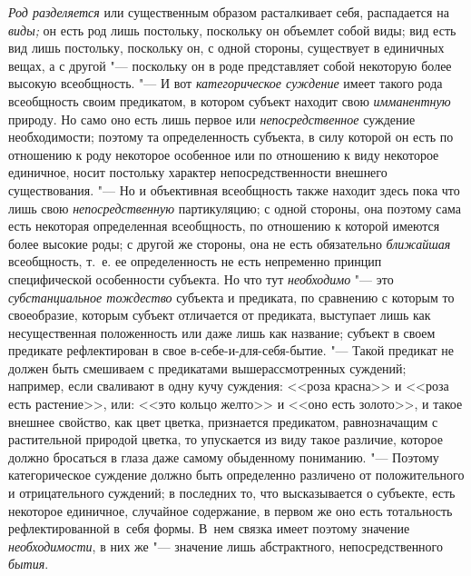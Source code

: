 {\em Род разделяется} или существенным образом расталкивает себя,
распадается на {\em виды;} он есть род
лишь постольку, поскольку он объемлет собой виды; вид есть вид лишь
постольку, поскольку он, с одной стороны, существует в единичных вещах, а с
другой "--- поскольку он в роде представляет собой некоторую
более высокую всеобщность. "--- И вот {\em категорическое суждение}
имеет такого рода всеобщность своим предикатом, в котором
субъект находит свою {\em имманентную}
природу. Но само оно есть лишь первое или {\em непосредственное}
суждение необходимости; поэтому та определенность субъекта, в
силу которой он есть по отношению к роду некоторое особенное или по
отношению к виду некоторое единичное, носит постольку характер
непосредственности внешнего существования. "--- Но и
объективная всеобщность также находит здесь пока что лишь
свою {\em непосредственную}
партикуляцию; с одной стороны, она поэтому сама есть
некоторая определенная всеобщность, по отношению к которой имеются более
высокие роды; с другой же стороны, она не есть обязательно {\em ближайшая}
всеобщность, т.~е. ее определенность не есть непременно
принцип специфической особенности субъекта. Но что тут
{\em необходимо} "--- это {\em субстанциальное тождество}
субъекта и предиката, по сравнению с которым то своеобразие,
которым субъект отличается от предиката, выступает лишь как несущественная
положенность или даже лишь как название; субъект в своем предикате
рефлектирован в свое в-себе-и-для-себя-бытие. "--- Такой
предикат не должен быть смешиваем с предикатами вышерассмотренных суждений;
например, если сваливают в одну кучу суждения: <<роза красна>> и
<<роза есть растение>>, или: <<это кольцо желто>> и <<оно есть золото>>,
и такое внешнее свойство, как цвет цветка, признается
предикатом, равнозначащим с растительной природой цветка, то упускается из
виду такое различие, которое должно бросаться в глаза даже самому
обыденному пониманию. "--- Поэтому категорическое суждение
должно быть определенно различено от положительного и отрицательного
суждений; в последних то, что высказывается о субъекте, есть некоторое
единичное, случайное содержание, в первом же оно есть тотальность
рефлектированной в~себя формы. В~нем связка имеет поэтому значение
{\em необходимости}, в них же "--- значение лишь абстрактного,
непосредственного {\em бытия}.

